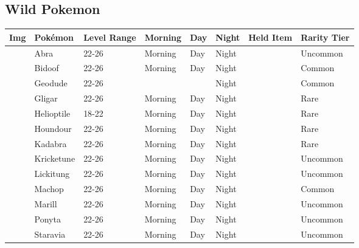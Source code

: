 \subsection{Wild Pokemon}%
\label{subsec:WildPokemon}%
\begin{longtable}{||l l l l l l l l||}%
\hline%
Img&Pokémon&Level Range&Morning&Day&Night&Held Item&Rarity Tier\\%
\hline%
\endhead%
\hline%
&Abra&22{-}26&Morning&Day&Night&&Uncommon\\%
\hline%
&Bidoof&22{-}26&Morning&Day&Night&&Common\\%
\hline%
&Geodude&22{-}26&&&Night&&Common\\%
\hline%
&Gligar&22{-}26&Morning&Day&Night&&Rare\\%
\hline%
&Helioptile&18{-}22&Morning&Day&Night&&Rare\\%
\hline%
&Houndour&22{-}26&Morning&Day&Night&&Rare\\%
\hline%
&Kadabra&22{-}26&Morning&Day&Night&&Rare\\%
\hline%
&Kricketune&22{-}26&Morning&Day&Night&&Uncommon\\%
\hline%
&Lickitung&22{-}26&Morning&Day&Night&&Uncommon\\%
\hline%
&Machop&22{-}26&Morning&Day&Night&&Common\\%
\hline%
&Marill&22{-}26&Morning&Day&Night&&Uncommon\\%
\hline%
&Ponyta&22{-}26&Morning&Day&Night&&Uncommon\\%
\hline%
&Staravia&22{-}26&Morning&Day&Night&&Uncommon\\%
\hline%
\end{longtable}
